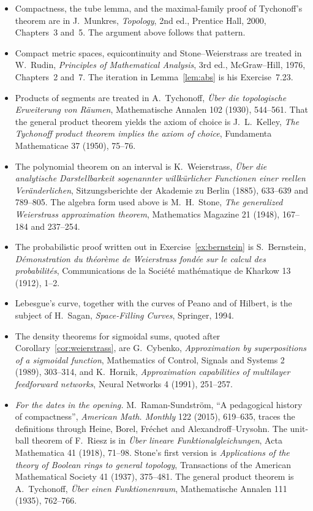 \begin{itemize}
\item Compactness, the tube lemma, and the maximal-family proof of Tychonoff's theorem are in J.~Munkres, \emph{Topology}, 2nd ed., Prentice Hall, 2000, Chapters~3 and~5. The argument above follows that pattern.
\item Compact metric spaces, equicontinuity and Stone--Weierstrass are treated in W.~Rudin, \emph{Principles of Mathematical Analysis}, 3rd ed., McGraw--Hill, 1976, Chapters~2 and~7. The iteration in Lemma~\ref{lem:abs} is his Exercise~7.23.
\item Products of segments are treated in A.~Tychonoff, \emph{\"Uber die topologische Erweiterung von R\"aumen}, Mathematische Annalen 102 (1930), 544--561. That the general product theorem yields the axiom of choice is J.~L.~Kelley, \emph{The Tychonoff product theorem implies the axiom of choice}, Fundamenta Mathematicae 37 (1950), 75--76.
\item The polynomial theorem on an interval is K.~Weierstrass, \emph{\"Uber die analytische Darstellbarkeit sogenannter willk\"urlicher Functionen einer reellen Ver\"anderlichen}, Sitzungsberichte der Akademie zu Berlin (1885), 633--639 and 789--805. The algebra form used above is M.~H.~Stone, \emph{The generalized Weierstrass approximation theorem}, Mathematics Magazine 21 (1948), 167--184 and 237--254.
\item The probabilistic proof written out in Exercise~\ref{ex:bernstein} is S.~Bernstein, \emph{D\'emonstration du th\'eor\`eme de Weierstrass fond\'ee sur le calcul des probabilit\'es}, Communications de la Soci\'et\'e math\'ematique de Kharkow 13 (1912), 1--2.
\item Lebesgue's curve, together with the curves of Peano and of Hilbert, is the subject of H.~Sagan, \emph{Space-Filling Curves}, Springer, 1994.
\item The density theorems for sigmoidal sums, quoted after Corollary~\ref{cor:weierstrass}, are G.~Cybenko, \emph{Approximation by superpositions of a sigmoidal function}, Mathematics of Control, Signals and Systems 2 (1989), 303--314, and K.~Hornik, \emph{Approximation capabilities of multilayer feedforward networks}, Neural Networks 4 (1991), 251--257.
\item \emph{For the dates in the opening.} M.~Raman-Sundstr\"om, ``A pedagogical history of compactness'', \emph{American Math. Monthly} 122 (2015), 619--635, traces the definitions through Heine, Borel, Fr\'echet and Alexandroff--Urysohn. The unit-ball theorem of F.~Riesz is in \emph{\"Uber lineare Funktionalgleichungen}, Acta Mathematica 41
(1918), 71--98. Stone's first version is \emph{Applications of the theory of Boolean rings to general topology}, Transactions of the American
Mathematical Society 41 (1937), 375--481. The general product theorem is A.~Tychonoff, \emph{\"Uber einen Funktionenraum}, Mathematische Annalen 111
(1935), 762--766.
\end{itemize}
